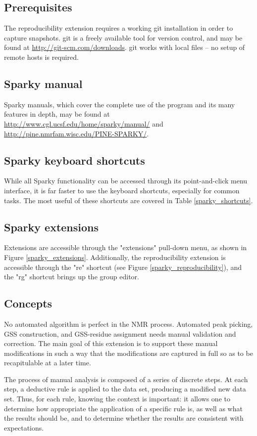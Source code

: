 \subsection{Prerequisites}
The reproducibility extension requires a working git installation in order
to capture snapshots.  git is a freely available tool for version control,
and may be found at \url{http://git-scm.com/downloads}.
git works with local files -- no setup of remote hosts is required.

\subsection{Sparky manual}
Sparky manuals, which cover the complete use of the program and its many
features in depth, may be found at 
\url{http://www.cgl.ucsf.edu/home/sparky/manual/} and 
\url{http://pine.nmrfam.wisc.edu/PINE-SPARKY/}.

\subsection{Sparky keyboard shortcuts}
While all Sparky functionality can be accessed through its point-and-click
menu interface, it is far faster to use the keyboard shortcuts, especially
for common tasks.  The most useful of these shortcuts are covered in Table
\ref{sparky_shortcuts}.

\subsection{Sparky extensions}
Extensions are accessible through the "extensions" pull-down menu,
as shown in Figure \ref{sparky_extensions}.
Additionally, the reproducibility extension is accessible through
the "re" shortcut (see Figure \ref{sparky_reproducibility}),
and the "rg" shortcut brings up the group editor.

\subsection{Concepts}
No automated algorithm is perfect in the NMR process.  Automated peak picking,
GSS construction, and GSS-residue assignment needs manual validation and
correction.  The main goal of this extension is to support these manual
modifications in such a way that the modifications are captured in full so
as to be recapitulable at a later time.

The process of manual analysis is composed of a series of discrete steps.
At each step, a deductive rule is applied to the data set, producing a
modified new data set.  Thus, for each rule, knowing the context is important:
it allows one to determine how appropriate the application of a specific rule
is, as well as what the results should be, and to determine whether the 
results are consistent with expectations.

